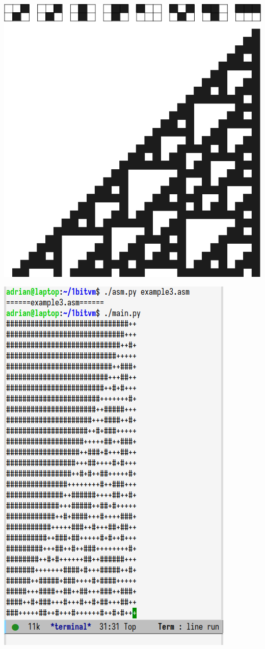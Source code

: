 \documentclass[12pt]{article}
\begin{document}
\begin{minipage}{.5\linewidth}
  \includegraphics[width=\linewidth]{slike/predstavitev/pravilo 110.png}
\end{minipage}
\hfill
\begin{minipage}{.5\linewidth}
  \includegraphics[width=.8\linewidth]{slike/pravilo110.png}
\end{minipage}
\end{document}

